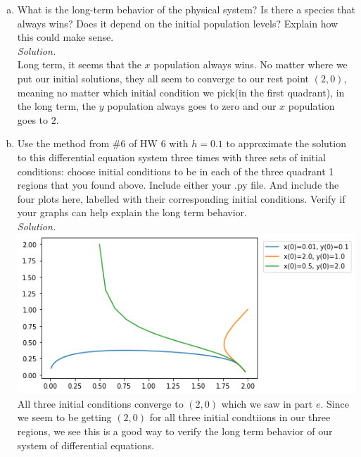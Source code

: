 \documentclass[12pt,letterpaper]{article}
\begin{document}
\begin{enumerate}
\begin{enumerate}[a)]
\item What is the long-term behavior of the physical system? Is there a species that always wins? Does it
depend on the initial population levels? Explain how this could make sense.
\\ \emph{Solution.}\\
Long term, it seems that the $x$ population always wins. No matter where we put our 
initial solutions, they all seem to converge to our rest point $(2, 0)$, meaning 
no matter which initial condition we pick(in the first quadrant), in the long term, the $y$ population 
always goes to zero and our $x$ population goes to $2$. 

\item Use the method from \#6 of HW 6 with $h=0.1$ to approximate the solution to this differential equation system three times with three sets of initial conditions: choose initial conditions to be in each of the three quadrant 1 regions that you found above.  Include either your .py file. And include the four plots here, labelled with their corresponding initial conditions. Verify if your graphs can help explain the long term behavior.
\\\emph{Solution.}\\
\includegraphics[scale = .8]{number5f.png}\\
All three initial conditions converge to $(2, 0)$ which we saw in part $e$. Since we 
seem to be getting $(2, 0)$ for all three initial condtiions in our three regions, we 
see this is a good way to verify the long term behavior of our system of differential 
equations.
\end{enumerate}

\end{enumerate}
\end{document}
